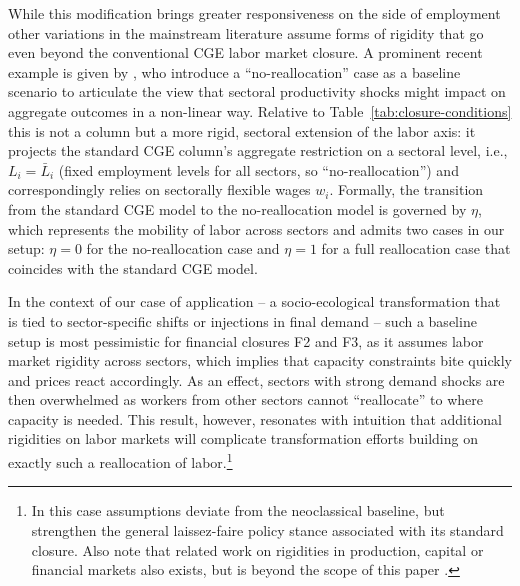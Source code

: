 While this modification brings greater responsiveness on the side of employment other variations in the mainstream literature assume forms of rigidity that go even beyond the conventional CGE labor market closure. A prominent recent example is given by \citet{BF2019}, who introduce a ``no-reallocation'' case as a baseline scenario to articulate the view that sectoral productivity shocks might impact on aggregate outcomes in a non-linear way. Relative to Table~\ref{tab:closure-conditions} this is not a column but
a more rigid, sectoral extension of the labor axis: it projects the standard CGE column's aggregate restriction on a sectoral level, i.e., $ L_i = \bar L_i$ (fixed employment levels for all sectors, so ``no-reallocation'') and correspondingly relies on sectorally flexible wages $w_i$. Formally, the transition from the standard CGE model to the no-reallocation model is governed by $\eta$, which represents the mobility of labor across sectors and admits two cases in our setup: $\eta=0$ for the no-reallocation case and $\eta=1$ for a full reallocation case that coincides with the standard CGE model.

In the context of our case of application -- a socio-ecological transformation that is tied to sector-specific shifts or injections in final demand -- such a baseline setup is most pessimistic for financial closures F2 and F3, as it assumes labor market rigidity across sectors, which implies that capacity constraints bite quickly and prices react accordingly. As an effect, sectors with strong demand shocks are then overwhelmed as workers from other sectors cannot ``reallocate'' to where capacity is needed. This result, however, resonates with intuition that additional rigidities on labor markets will complicate transformation efforts building on exactly such a reallocation of labor.\footnote{In this case assumptions deviate from the neoclassical baseline, but strengthen the general laissez-faire policy stance associated with its standard closure. Also note that related work on rigidities in production, capital or financial markets also exists, but is beyond the scope of this paper \citep[see, however, ][]{BF2022, BernankeGertlerGilchrist.1999}.}


